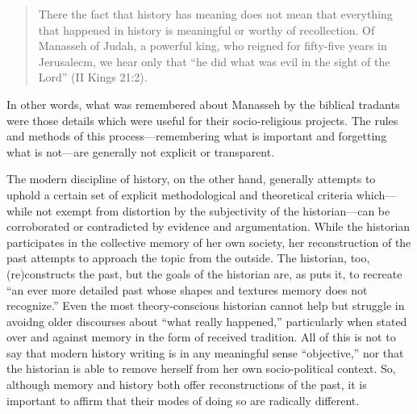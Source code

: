 \begin{quote}
There the fact that history has meaning does not mean that everything
that happened in history is meaningful or worthy of recollection. Of
Manasseh of Judah, a powerful king, who reigned for fifty-five years in
Jerusalecm, we hear only that ``he did what was evil in the sight of the
Lord'' (II Kings 21:2).\autocite[10]{yerushalmi1989}
\end{quote}

In other words, what was remembered about Manasseh by the biblical
tradants were those details which were useful for their socio-religious
projects. The rules and methods of this process---remembering what is
important and forgetting what is not---are generally not explicit or
transparent.

The modern discipline of history, on the other hand, generally attempts
to uphold a certain set of explicit methodological and theoretical
criteria which---while not exempt from distortion by the subjectivity of
the historian---can be corroborated or contradicted by evidence and
argumentation.\autocite[As Daniel Pioske puts it, ``What separates the
act of historiography from the recounting of a culture's sanctioned
memories is consequently the historians' determination to isolate and
compare disparate testimonies about the past with other past traces that
may corroborate or discredit their
claims.''][302--303]{pioske_bibint2015} While the historian participates
in the collective memory of her own society, her reconstruction of the
past attempts to approach the topic from the outside. The historian,
too, (re)constructs the past, but the goals of the historian are, as
\yerushalmi puts it, to recreate ``an ever more detailed
past whose shapes and textures memory does not
recognize.''\autocites[94]{yerushalmi1989}[See
also][532]{verovsek_pgi2016} Even the most theory-conscious historian
cannot help but struggle in avoidng older discourses about ``what really
happened,'' particularly when stated over and against memory in the form
of received tradition. All of this is not to say that modern history
writing is in any meaningful sense ``objective,'' nor that the historian
is able to remove herself from her own socio-political context. So,
although memory and history both offer reconstructions of the past, it
is important to affirm that their modes of doing so are radically
different.\autocite[Pioske observes, ``The epistemological tension
observed by Ricoeur between memory and history is thus understood as the
outcome of two processes that, though having the similar intent of
re-presenting former phenomena, nevertheless pursue and mediate the past
through quite disparate means.''][302]{pioske_bibint2015}

